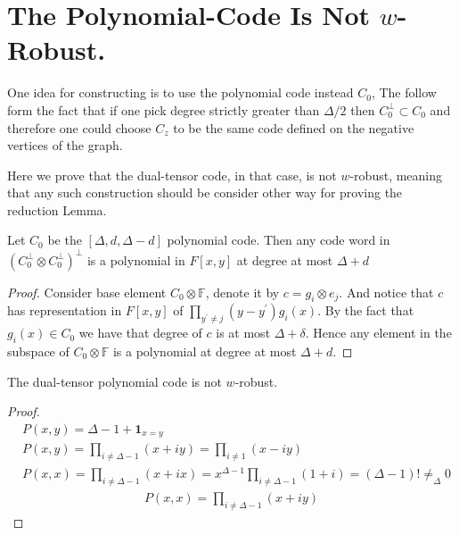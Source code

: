 
\section{The Polynomial-Code Is Not $w$-Robust.}
One idea for constructing is to use the polynomial code instead $C_{0}$, The follow form the fact that if one pick degree strictly greater than $\Delta/2$ then $C_{0}^{\perp} \subset C_{0}$ and therefore one could choose $C_{z}$ to be the same code defined on the negative vertices of the graph. 

Here we prove that the dual-tensor code, in that case, is not $w$-robust, meaning that any such construction should be consider other way for proving the reduction Lemma.  

\begin{claim}
  \label{claim:poldu}
  Let $C_{0}$ be the $[\Delta,d, \Delta-d]$ polynomial code. Then any code word in $\left( C_{0}^{\perp} \otimes C_{0}^{\perp} \right)^{\perp}$ is a polynomial in $F[x,y]$ at degree at most $\Delta + d$
\end{claim}
\begin{proof}
Consider base element $ C_{0} \otimes \mathbb{F} $, denote it by $c = g_{i} \otimes e_{j}$. And notice that $c$ has representation in $F[x,y]$ of $\prod_{y^{\prime} \neq j}{\left( y - y^{\prime} \right) }g_{i}\left( x \right)$. By the fact that $g_{i}\left( x \right) \in C_{0} $ we have that degree of $c$ is at most $\Delta + \delta$. Hence any element in the subspace of $C_{0} \otimes \mathbb{F}$ is a polynomial at degree at most $\Delta + d$.   
\end{proof}

\begin{claim}
 \label{claim:nowr} The dual-tensor polynomial code is not $w$-robust. 
\end{claim}

\begin{proof}

  \begin{equation*}
    \begin{split}
      & P(x,y) = \Delta - 1 + \mathbf{1}_{ x = y } \\ 
     & P(x,y) = \prod_{i \neq \Delta - 1}{ \left( x + i y \right)  }=\prod_{i \neq  1}{ \left( x - i y \right)  } \\ 
     & P(x,x) = \prod_{i \neq \Delta - 1}{ \left( x + i x \right)  }= x^{\Delta-1}\prod_{i \neq \Delta - 1}{ \left( 1 + i \right) } = \left( \Delta-1 \right)! \neq_{\Delta} 0  
    \end{split}
  \end{equation*}
  \begin{equation*}
    \begin{split}
      P(x,x) = \prod_{i \neq \Delta - 1}{ \left( x + i y \right)  }
    \end{split}
  \end{equation*}
\end{proof}

